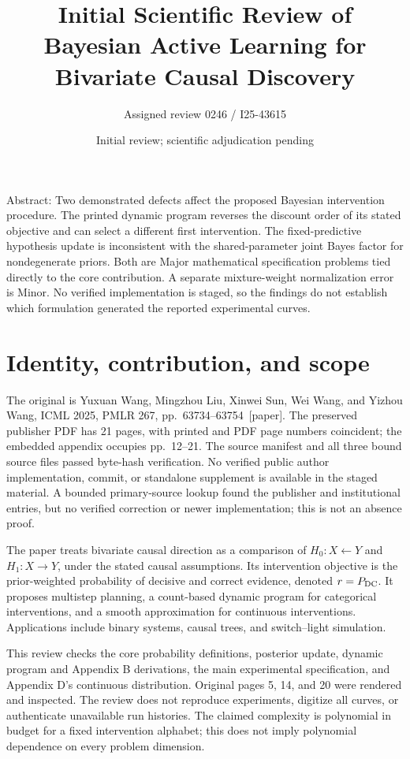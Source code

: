 \documentclass[10pt]{article}
\title{Initial Scientific Review of
Bayesian Active Learning for Bivariate Causal Discovery}
\author{Assigned review 0246 / I25-43615}
\date{Initial review; scientific adjudication pending}
\begin{document}
\maketitle
Abstract: Two demonstrated defects affect the proposed Bayesian intervention procedure. The printed dynamic program reverses the discount order of its stated objective and can select a different first intervention. The fixed-predictive hypothesis update is inconsistent with the shared-parameter joint Bayes factor for nondegenerate priors. Both are Major mathematical specification problems tied directly to the core contribution. A separate mixture-weight normalization error is Minor. No verified implementation is staged, so the findings do not establish which formulation generated the reported experimental curves.\par
\section*{Identity, contribution, and scope}
The original is Yuxuan Wang, Mingzhou Liu, Xinwei Sun, Wei Wang, and Yizhou Wang, ICML 2025, PMLR 267, pp. 63734–63754 [paper]. The preserved publisher PDF has 21 pages, with printed and PDF page numbers coincident; the embedded appendix occupies pp. 12–21. The source manifest and all three bound source files passed byte-hash verification. No verified public author implementation, commit, or standalone supplement is available in the staged material. A bounded primary-source lookup found the publisher and institutional entries, but no verified correction or newer implementation; this is not an absence proof.\par
The paper treats bivariate causal direction as a comparison of \(H_0:X\leftarrow Y\) and \(H_1:X\to Y\), under the stated causal assumptions. Its intervention objective is the prior-weighted probability of decisive and correct evidence, denoted \(r=P_{\rm DC}\). It proposes multistep planning, a count-based dynamic program for categorical interventions, and a smooth approximation for continuous interventions. Applications include binary systems, causal trees, and switch–light simulation.\par
This review checks the core probability definitions, posterior update, dynamic program and Appendix B derivations, the main experimental specification, and Appendix D’s continuous distribution. Original pages 5, 14, and 20 were rendered and inspected. The review does not reproduce experiments, digitize all curves, or authenticate unavailable run histories. The claimed complexity is polynomial in budget for a fixed intervention alphabet; this does not imply polynomial dependence on every problem dimension.\par
\end{document}
